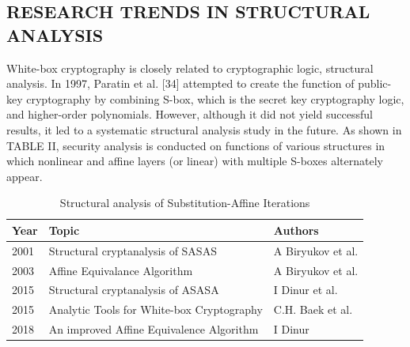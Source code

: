 \documentclass{ieeeaccess}
\begin{document}
\subsection{RESEARCH TRENDS IN STRUCTURAL ANALYSIS}
White-box cryptography is closely related to cryptographic logic, structural analysis. In 1997, Paratin et al. [34] attempted to create the function of public-key cryptography by combining S-box, which is the secret key cryptography logic, and higher-order polynomials. However, although it did not yield successful results, it led to a systematic structural analysis study in the future. As shown in TABLE II, security analysis is conducted on functions of various structures in which nonlinear and affine layers (or linear) with multiple S-boxes alternately appear. 

\begin{table}
\caption{Structural analysis of Substitution-Affine Iterations}
\label{table}
\setlength{\tabcolsep}{3pt}
\begin{tabular}{|p{20pt}|p{140pt}|p{60pt}|}
\hline
Year& 
Topic& 
Authors \\
\hline
2001 
& Structural cryptanalysis of SASAS 
& A Biryukov et al. \\
2003 
& Affine Equivalance Algorithm 
& A Biryukov et al. \\
2015
& Structural cryptanalysis of ASASA 
& I Dinur et al. \\
2015
& Analytic Tools for White-box Cryptography 
& C.H. Baek et al. \\
2018 
& An improved Affine Equivalence Algorithm
& I Dinur \\
\hline
\end{tabular}
\label{tab1}
\end{table}
\end{document}
